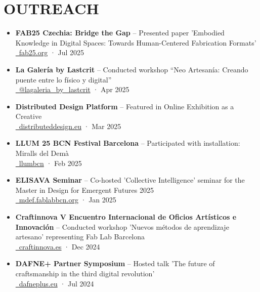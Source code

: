 \documentclass[11pt,a4paper]{article}
\begin{document}
\section*{OUTREACH}
\begin{itemize}[leftmargin=*,label={},itemsep=2pt]
    \item \textbf{FAB25 Czechia: Bridge the Gap} -- Presented paper 'Embodied Knowledge in Digital Spaces: Towards Human-Centered Fabrication Formats'\\
    \href{https://fab25.fabevent.org/}{\faGlobe\ fab25.org} · Jul 2025

    \item \textbf{La Galería by Lastcrit} -- Conducted workshop ``Neo Artesanía: Creando puente entre lo físico y digital''\\
    \href{https://www.instagram.com/p/DIePpM6ts27/?utm_source=ig_web_copy_link&igsh=MzRlODBiNWFlZA==}{\faInstagram\ @lagaleria\_by\_lastcrit} · Apr 2025
    
    \item \textbf{Distributed Design Platform} -- Featured in Online Exhibition as a Creative\\
    \href{https://distributeddesign.eu/}{\faLink\ distributeddesign.eu} · Mar 2025
    
    \item \textbf{LLUM 25 BCN Festival Barcelona} -- Participated with installation: Miralls del Demà\\
    \href{https://www.barcelona.cat/llumbcn/ca}{\faGlobe\ llumbcn} · Feb 2025
    
    \item \textbf{ELISAVA Seminar} -- Co-hosted 'Collective Intelligence' seminar for the Master in Design for Emergent Futures 2025\\
    \href{https://mdef.fablabbcn.org/}{\faUniversity\ mdef.fablabbcn.org} · Jan 2025
    
    \item \textbf{Craftinnova V Encuentro Internacional de Oficios Artísticos e Innovación} -- Conducted workshop 'Nuevos métodos de aprendizaje artesano' representing Fab Lab Barcelona\\
    \href{https://www.craftinnova.es/}{\faGlobe\ craftinnova.es} · Dec 2024
    
    \item \textbf{DAFNE+ Partner Symposium} -- Hosted talk 'The future of craftsmanship in the third digital revolution'\\
    \href{https://dafneplus.eu/}{\faGlobe\ dafneplus.eu} · Jul 2024
    

\end{itemize}
\end{document}
